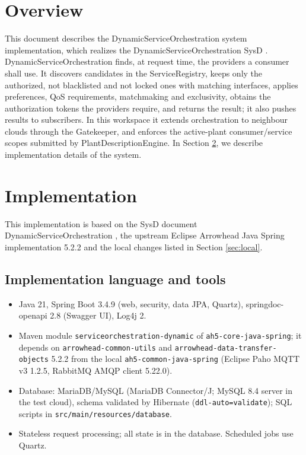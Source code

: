 \documentclass[a4paper]{arrowhead}
\begin{document}
\section{Overview}
\label{sec:overview}

This document describes the DynamicServiceOrchestration system implementation, which realizes the DynamicServiceOrchestration SysD \cite{dso-sysd}. Dynamic\allowbreak{}Service\allowbreak{}Orchestration finds, at request time, the providers a consumer shall use. It discovers candidates in the ServiceRegistry, keeps only the authorized, not blacklisted and not locked ones with matching interfaces, applies preferences, QoS requirements, matchmaking and exclusivity, obtains the authorization tokens the providers require, and returns the result; it also pushes results to subscribers. In this workspace it extends orchestration to neighbour clouds through the Gatekeeper, and enforces the active-plant consumer/service scopes submitted by Plant\allowbreak{}Description\allowbreak{}Engine.
In Section \ref{Implementation}, we describe implementation details of the system.

\newpage

\section{Implementation}
\label{Implementation}

This implementation is based on the SysD document DynamicServiceOrchestration \cite{dso-sysd}, the upstream Eclipse Arrowhead Java Spring implementation 5.2.2 \cite{ah5java} and the local changes listed in Section \ref{sec:local}.

\subsection{Implementation language and tools}
\begin{itemize}
\item Java 21, Spring Boot 3.4.9 (web, security, data JPA, Quartz), springdoc-openapi 2.8 (Swagger UI), Log4j 2.
\item Maven module \texttt{serviceorchestration-dynamic} of \texttt{ah5-core-java-spring}; it depends on \texttt{arrowhead-common-utils} and \texttt{arrowhead-data-transfer-objects} 5.2.2 from the local \texttt{ah5-common-java-spring} (Eclipse Paho MQTT v3 1.2.5, RabbitMQ AMQP client 5.22.0).
\item Database: MariaDB/MySQL (MariaDB Connector/J; MySQL 8.4 server in the test cloud), schema validated by Hibernate (\texttt{ddl-auto=validate}); SQL scripts in \texttt{src/main/resources/database}.
\item Stateless request processing; all state is in the database. Scheduled jobs use Quartz.
\end{itemize}
\end{document}
